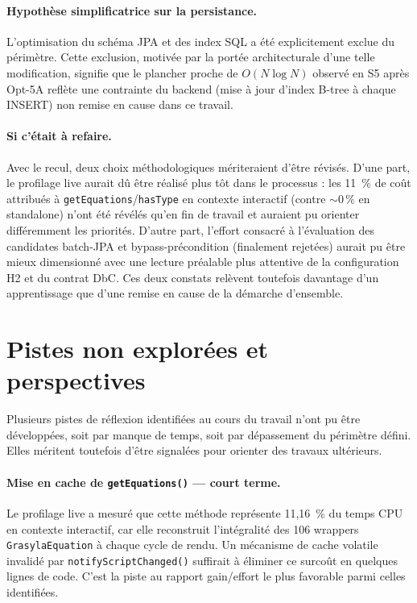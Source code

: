 \paragraph{Hypothèse simplificatrice sur la persistance.}
L'optimisation du schéma JPA et des index SQL a été explicitement exclue du
périmètre. Cette exclusion, motivée par la portée architecturale d'une telle
modification, signifie que le plancher proche de $O(N \log N)$ observé en S5
après Opt-5A reflète une contrainte du backend (mise à jour d'index B-tree à
chaque INSERT) non remise en cause dans ce travail.

\paragraph{Si c'était à refaire.}
Avec le recul, deux choix méthodologiques mériteraient d'être révisés. D'une
part, le profilage live aurait dû être réalisé plus tôt dans le processus :
les 11~\% de coût attribués à \texttt{getEquations}/\texttt{hasType} en
contexte interactif (contre $\sim 0\,\%$ en standalone) n'ont été révélés
qu'en fin de travail et auraient pu orienter différemment les priorités.
D'autre part, l'effort consacré à l'évaluation des candidates batch-JPA et
bypass-précondition (finalement rejetées) aurait pu être mieux dimensionné
avec une lecture préalable plus attentive de la configuration H2 et du
contrat DbC.
Ces deux constats relèvent toutefois davantage d'un apprentissage que d'une
remise en cause de la démarche d'ensemble.

\section{Pistes non explorées et perspectives}

Plusieurs pistes de réflexion identifiées au cours du travail n'ont pu être
développées, soit par manque de temps, soit par dépassement du périmètre
défini. Elles méritent toutefois d'être signalées pour orienter des travaux
ultérieurs.

\paragraph{Mise en cache de \texttt{getEquations()} — court terme.}
Le profilage live a mesuré que cette méthode représente 11,16~\% du temps CPU
en contexte interactif, car elle reconstruit l'intégralité des 106 wrappers
\texttt{GrasylaEquation} à chaque cycle de rendu. Un mécanisme de cache
volatile invalidé par \texttt{notifyScriptChanged()} suffirait à éliminer ce
surcoût en quelques lignes de code. C'est la piste au rapport gain/effort le
plus favorable parmi celles identifiées.

